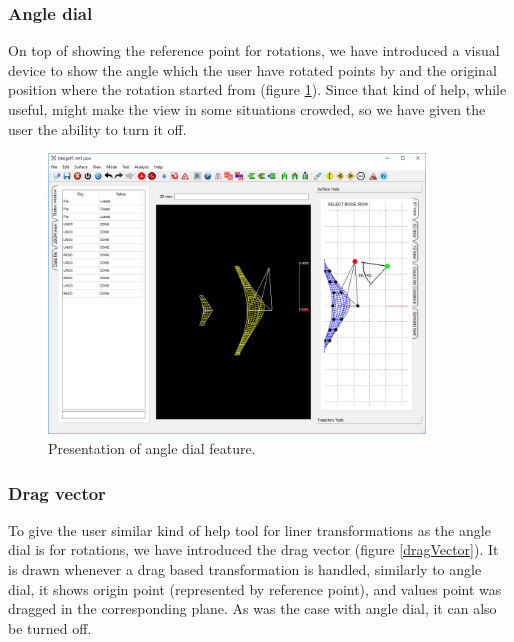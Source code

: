 \documentclass[a4paper, 11pt, article]{report}
\begin{document}
\subsubsection{Angle dial}

On top of showing the reference point for rotations, we have introduced a visual device to show the angle which the user have rotated points by and the original position where the rotation started from (figure \ref{angleDial}). Since that kind of help, while useful, might make the view in some situations crowded, so we have given the user the ability to turn it off.

\begin{figure}[!h]
	\centering
	
	\includegraphics[width=10cm]{images/angle_dial.png}
	
	\caption{Presentation of angle dial feature.}
	
	\label{angleDial}
\end{figure}

\subsubsection{Drag vector}

To give the user similar kind of help tool for liner transformations as the angle dial is for rotations, we have introduced the drag vector (figure \ref{dragVector}). It is drawn whenever a drag based transformation is handled, similarly to angle dial, it shows origin point (represented by reference point), and values point was dragged in the corresponding plane. As was the case with angle dial, it can also be turned off.
\end{document}
